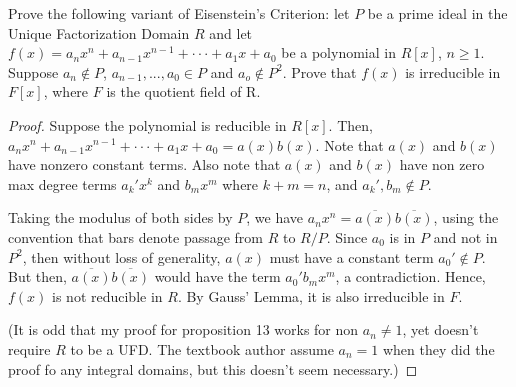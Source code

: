 \documentclass[10pt]{article}
\newenvironment{problem}[2][Problem]{\begin{trivlist}
		\item[\hskip \labelsep {\bfseries #1}\hskip \labelsep {\bfseries #2.}]}{\end{trivlist}}
\begin{document}
	\begin{problem}{4.17}
		Prove the following variant of Eisenstein's Criterion: let $P$ be a prime ideal in the Unique Factorization Domain $R$ and let $f(x) = a_nx^n + a_{n-1}x^{n-1} + · · · + a_1x + a_0$ be a polynomial in $R[x]$, $n \geq 1$. Suppose $a_n \not \in P$, $a_{n-1},...,a_0 \in P$ and $a_o \not \in P^2$. Prove that $f(x)$ is irreducible in $F[x]$, where $F$ is the quotient field of R.
		\begin{proof}
			Suppose the polynomial is reducible in $R[x]$. Then, $a_nx^n + a_{n-1}x^{n-1} + · · · + a_1x + a_0 = a(x)b(x)$. Note that $a(x)$ and $b(x)$ have nonzero constant terms. Also note that $a(x)$ and $b(x)$ have non zero max degree terms $a_k'x^k$ and $b_mx^m$ where $k+m=n$, and $a_k', b_m \not \in P$. 
			
			Taking the modulus of both sides by $P$, we have $a_nx^n = \overline{a(x)}\overline{b(x)}$, using the convention that bars denote passage from $R$ to $R/P$. Since $a_0$ is in $P$ and not in $P^2$, then without loss of generality, $a(x)$ must have a constant term $a_0' \not \in P$. But then, $\overline{a(x)}\overline{b(x)}$ would have the term $a_0'b_mx^m$, a contradiction. Hence, $f(x)$ is not reducible in $R$. By Gauss' Lemma, it is also irreducible in $F$.
			
			(It is odd that my proof for proposition 13 works for non $a_n \not = 1$, yet doesn't require $R$ to be a UFD. The textbook author assume $a_n=1$ when they did the proof fo any integral domains, but this doesn't seem necessary.) 
		\end{proof}
	\end{problem}
	
\end{document}
